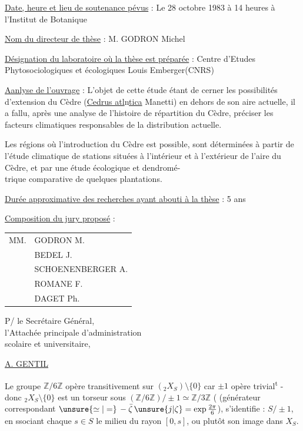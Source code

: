 \uline{Date, heure et lieu de soutenance pévus} : Le 28 octobre 1983 à 14 heures à l'Institut de Botanique

\uline{Nom du directeur de thèse} : M. GODRON Michel

\uline{Désignation du laboratoire où la thèse est préparée} : Centre d'Etudes Phytosociologiques et écologiques Louis Emberger(CNRS)

\uline{Aanlyse de l'ouvrage} : L'objet de cette étude étant de cerner les possibilités d'extension du Cèdre (\uline{Cedrus atl}n\uline{tica} Manetti) en dehors de son aire actuelle, il a fallu, après une analyse de l'histoire de répartition du Cèdre, préciser les facteurs climatiques responsables de la distribution actuelle.

Les régions où l'introduction du Cèdre est possible, sont déterminées à partir de l'étude climatique de stations situées à l'intérieur et à l'extérieur de l'aire du Cèdre, et par une étude écologique et dendromé-\\
trique comparative de quelques plantations.

\uline{Durée approximative des recherches ayant abouti à la thèse} : 5 ans

\uline{Composition du jury proposé} : \begin{tabular}[t]{ll}
MM. & GODRON M.\\
& BEDEL J.\\
& SCHOENENBERGER A.\\
& ROMANE F.\\
& DAGET Ph.
\end{tabular}

\begin{flushright}
P/ le Secrétaire Général,\\
l'Attachée principale d'administration\\
scolaire et universitaire,


\uline{A. GENTIL}
\end{flushright}



Le groupe $\mathbb Z/6\mathbb Z$ opère transitivement sur
$({}_2X_S)\setminus\{0\}$ \unsure{(}car $\pm1$ opère trivial\textsuperscript{t} - donc
${}_2X_S\setminus\{0\}$ est un torseur sous
$(\mathbb Z/6\mathbb Z)/\pm1\simeq\mathbb Z/3\mathbb Z$
( (générateur correspondant
$\unsure{\simeq|=}\,-\bar\zeta\,\unsure{j|\zeta}=\exp\frac{2\pi}{6}$),
 
s'identifie : $S/\pm1$, en ssociant
 chaque $s\in S$ le milieu du rayon
$[0,s]$, ou plutôt son image dans \unsure{\inserted{)}} $X_S$.

